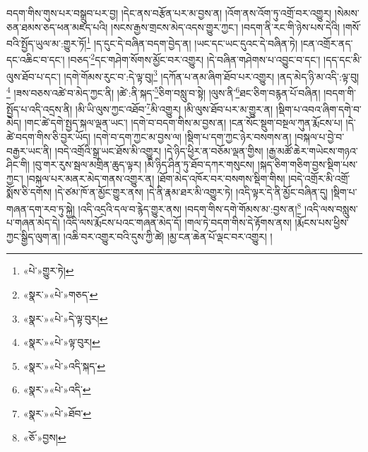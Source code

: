 བདག་གིས་གུས་པར་བསྒྲུབ་པར་བྱ། །དེང་ནས་བརྩོན་པར་མ་བྱས་ན། །འོག་ནས་འོག་ཏུ་འགྲོ་བར་འགྱུར། །སེམས་ཅན་ཐམས་ཅད་ཕན་མཛད་པའི། །སངས་རྒྱས་གྲངས་མེད་འདས་གྱུར་ཀྱང་། །བདག་ནི་རང་གི་ཉེས་པས་དེའི། །གསོ་བའི་སྤྱོད་ཡུལ་མ་:གྱུར་ཏོ།\footnote{«པེ་»གྱུར་ཏེ།} །ད་དུང་དེ་བཞིན་བདག་བྱེད་ན། །ཡང་དང་ཡང་དུའང་དེ་བཞིན་ཏེ། །ངན་འགྲོར་ནད་དང་འཆིང་བ་དང་། །བཅད་\footnote{«སྣར་»«པེ་»གཅད་}དང་གཤེག་སོགས་མྱོང་བར་འགྱུར། །དེ་བཞིན་གཤེགས་པ་འབྱུང་བ་དང་། །དད་དང་མི་ལུས་ཐོབ་པ་དང་། །དགེ་གོམས་རུང་བ་:དེ་ལྟ་བུ།\footnote{«སྣར་»«པེ་»དེ་ལྟ་བུར།} །དཀོན་པ་ནམ་ཞིག་ཐོབ་པར་འགྱུར། །ནད་མེད་ཉི་མ་འདི་:ལྟ་བུ།\footnote{«སྣར་»«པེ་»ལྟ་བུར།} །ཟས་བཅས་འཚེ་བ་མེད་ཀྱང་ནི། །ཚེ་:ནི་སྐད་\footnote{«སྣར་»«པེ་»འདི་སྐད་}ཅིག་བསླུ་བ་སྟེ། །ལུས་ནི་\footnote{«སྣར་»«པེ་»འདི་}ཐང་ཅིག་བརྙན་པོ་བཞིན། །བདག་གི་སྤྱོད་པ་འདི་འདྲས་ནི། །མི་ཡི་ལུས་ཀྱང་འཐོབ་\footnote{«སྣར་»«པེ་»ཐོབ་}མི་འགྱུར། །མི་ལུས་ཐོབ་པར་མ་གྱུར་ན། །སྡིག་པ་འབའ་ཞིག་དགེ་བ་མེད། །གང་ཚེ་དགེ་སྤྱད་སྐལ་ལྡན་ཡང་། །དགེ་བ་བདག་གིས་མ་བྱས་ན། །ངན་སོང་སྡུག་བསྔལ་ཀུན་རྨོངས་པ། །དེ་ཚེ་བདག་གིས་ཅི་བྱར་ཡོད། །དགེ་བ་དག་ཀྱང་མ་བྱས་ལ། །སྡིག་པ་དག་ཀྱང་ཉེར་བསགས་ན། །བསྐལ་པ་བྱེ་བ་བརྒྱར་ཡང་ནི། །བདེ་འགྲོའི་སྒྲ་ཡང་ཐོས་མི་འགྱུར། །དེ་ཉིད་ཕྱིར་ན་བཅོམ་ལྡན་གྱིས། །རྒྱ་མཚོ་ཆེར་གཡེངས་གཉའ་ཤིང་གི། །བུ་གར་རུས་སྦལ་མགྲིན་ཆུད་ལྟར། །མི་ཉིད་ཤིན་ཏུ་ཐོབ་དཀར་གསུངས། །སྐད་ཅིག་གཅིག་བྱས་སྡིག་པས་ཀྱང་། །བསྐལ་པར་མནར་མེད་གནས་འགྱུར་ན། །ཐོག་མེད་འཁོར་བར་བསགས་སྡིག་གིས། །བདེ་འགྲོར་མི་འགྲོ་སྨོས་ཅི་དགོས། །དེ་ཙམ་ཁོ་ན་མྱོང་གྱུར་ནས། །དེ་ནི་རྣམ་ཐར་མི་འགྱུར་ཏེ། །འདི་ལྟར་དེ་ནི་མྱོང་བཞིན་དུ། །སྡིག་པ་གཞན་དག་རབ་ཏུ་སྐྱེ། །འདི་འདྲའི་དལ་བ་རྙེད་གྱུར་ནས། །བདག་གིས་དགེ་གོམས་མ་:བྱས་ན།\footnote{«ཅོ་»བྱས།} །འདི་ལས་བསླུས་པ་གཞན་མེད་དེ། །འདི་ལས་རྨོངས་པའང་གཞན་མེད་དོ། །གལ་ཏེ་བདག་གིས་དེ་རྟོགས་ནས། །རྨོངས་པས་ཕྱིས་ཀྱང་སྒྱིད་ལུག་ན། །འཆི་བར་འགྱུར་བའི་དུས་ཀྱི་ཚེ། །མྱ་ངན་ཆེན་པོ་ལྡང་བར་འགྱུར། །
